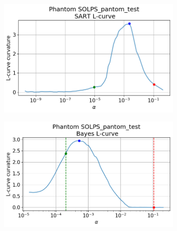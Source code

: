 \begin{figure}
\begin{subfigure}{0.45\linewidth}
         \caption{}
         \label{fig:SOLPS_phantom2b}
     \end{subfigure}
     \begin{subfigure}{0.45\linewidth}
         \centering
         \includegraphics[trim={0 0 0 45},clip,width=\textwidth]{Chapters/chapter2/figs/inversion_comparison_L_curve_curvature_SOLPS_pantom_test-SART.png}
         \caption{}
         \label{fig:SOLPS_phantom2c}
     \end{subfigure}
     \hfill
     \begin{subfigure}{0.45\linewidth}
         \centering
         \includegraphics[trim={0 0 0 45},clip,width=\textwidth]{Chapters/chapter2/figs/inversion_comparison_L_curve_curvature_SOLPS_pantom_test-Bayes.png}
         \caption{}
         \label{fig:SOLPS_phantom2d}
     \end{subfigure}
     \begin{subfigure}{0.49\linewidth}
         \centering

\end{subfigure}
\end{figure}
